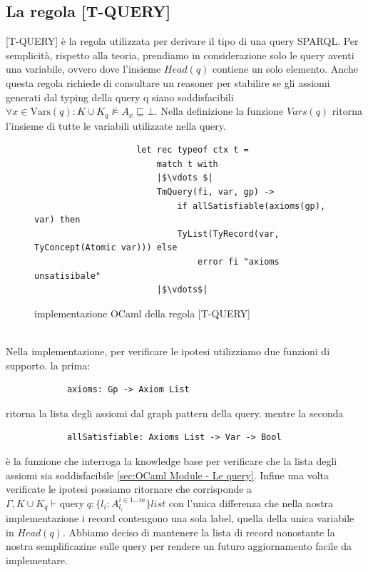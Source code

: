             \subsection{La regola [T-QUERY]}
            [T-QUERY] è la regola utilizzata per derivare il tipo di una query SPARQL. Per semplicità, rispetto alla teoria, prendiamo in considerazione solo le query
            aventi una variabile, ovvero dove l'insieme $Head(q)$ contiene un solo elemento. Anche questa regola richiede di consultare un reasoner per stabilire se
            gli assiomi generati dal typing della query q siano soddisfacibili $\forall x \in \textrm{Vars}(q) : K \cup K_q \nvDash A_x \sqsubseteq \bot$.
            Nella definizione la funzione $Vars(q)$ ritorna l'insieme di tutte le variabili utilizzate nella query.
            \begin{figure}[h]
                \begin{verbatim}
                    let rec typeof ctx t =
                        match t with
                        |$\vdots $|
                        TmQuery(fi, var, gp) ->
                            if allSatisfiable(axioms(gp), var) then
                            TyList(TyRecord(var, TyConcept(Atomic var))) else
                                error fi "axioms unsatisibale"
                        |$\vdots$|
                \end{verbatim}
            \caption{implementazione OCaml della regola [T-QUERY]}
            \end{figure}
            \\Nella implementazione, per verificare le ipotesi utilizziamo due funzioni di supporto. la prima:
            \begin{verbatim}
            axioms: Gp -> Axiom List
            \end{verbatim}
            ritorna la lista degli assiomi dal graph pattern della query. mentre la seconda
            \begin{verbatim}
            allSatisfiable: Axioms List -> Var -> Bool
            \end{verbatim}
            è la funzione che interroga la knowledge base per verificare che la lista degli assiomi sia soddisfacibile \ref{sec:OCaml Module - Le query}. Infine una volta verificate le ipotesi possiamo
            ritornare
             che corrisponde a $\Gamma,K \cup K_q \vdash \textrm{query} \; q : \{l_i : A_{l_i}^{i \in 1...m}\} list$
            con l'unica differenza che nella nostra implementazione i record contengono una sola label, quella della unica variabile in $Head(q)$. Abbiamo deciso di
            mantenere la lista di record nonostante la nostra semplificazine sulle query per rendere un futuro aggiornamento facile da implementare.
